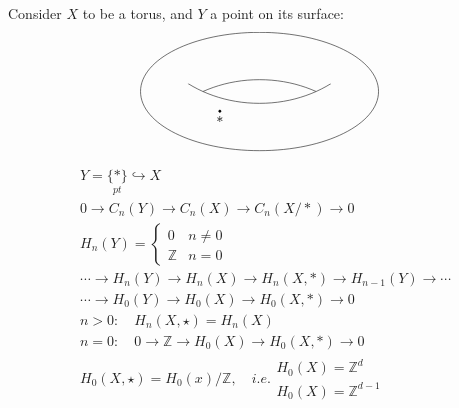\documentclass[11pt,a4paper]{report}
\begin{document}
               \begin{Ex} Consider $X$ to be a torus, and $Y$ a point on its surface: \\

               \[
               \begin{tikzpicture}
                        \useasboundingbox (-3,-1.5) rectangle (3,1.5);
                        \draw (0,0) ellipse (3 and 1.5);
                        \coordinate [label=below:$\ast$] (0) at (-1,-0.5);
                        \draw[fill] (0) circle [radius=0.03];
                        \begin{scope}
                            \clip (0,-1.8) ellipse (3 and 2.5);
                            \draw (0,2.2) ellipse (3 and 2.5);
                        \end{scope}
                        \begin{scope}
                            \clip (0,2.2) ellipse (3 and 2.5);
                            \draw (0,-2.2) ellipse (3 and 2.5);
                        \end{scope}
                \end{tikzpicture}
                \]
                \begin{align*}
                  &Y = \underset{pt}{\{*\}} \hookrightarrow X\\
                  &0 \rightarrow C_n(Y) \rightarrow C_n(X) \rightarrow C_n(X/\ast) \rightarrow 0\\
                  &H_n(Y) = \left\{ \begin{array}{cc}0&n\ne0\\\mathbb{Z}&n=0\end{array} \right. \quad \\
                  &\cdots \rightarrow H_n(Y) \rightarrow H_n(X) \rightarrow H_n(X,\ast) \rightarrow H_{n-1}(Y) \rightarrow \cdots\\
                  &\cdots \rightarrow H_0(Y) \rightarrow H_0(X) \rightarrow H_0(X,\ast) \rightarrow 0\\
                  &n > 0: \quad H_n(X,\star) = H_n(X)\\
                  &n = 0: \quad 0 \rightarrow \mathbb{Z} \rightarrow H_0(X) \rightarrow H_0(X,\ast) \rightarrow 0\\
                  &H_0(X,\star) = H_0(x)/\mathbb{Z}, \quad i.e. \left.\begin{array}{l}H_0(X) = \mathbb{Z}^d\\H_0(X) = \mathbb{Z}^{d-1}\end{array} \right.\\
                \end{align*}
               \end{Ex}
\end{document}
